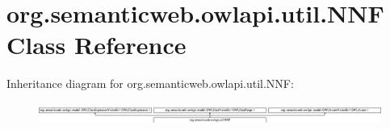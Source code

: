 \hypertarget{classorg_1_1semanticweb_1_1owlapi_1_1util_1_1_n_n_f}{\section{org.\-semanticweb.\-owlapi.\-util.\-N\-N\-F Class Reference}
\label{classorg_1_1semanticweb_1_1owlapi_1_1util_1_1_n_n_f}
}
Inheritance diagram for org.\-semanticweb.\-owlapi.\-util.\-N\-N\-F\-:\begin{figure}[H]
\begin{center}
\leavevmode
\includegraphics[height=0.717949cm]{classorg_1_1semanticweb_1_1owlapi_1_1util_1_1_n_n_f}
\end{center}
\end{figure}

